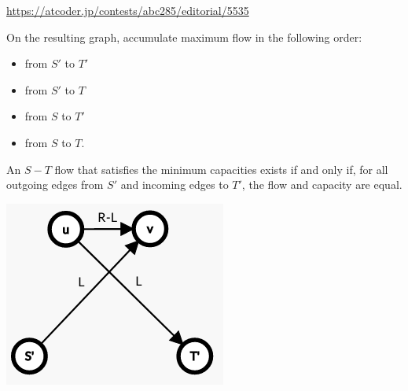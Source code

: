 \url{https://atcoder.jp/contests/abc285/editorial/5535}

On the resulting graph, 
accumulate maximum flow in the following order:
\begin{itemize}
\item from $S'$ to $T'$
\item from $S'$ to $T$
\item from $S$ to $T'$
\item from $S$ to $T$.
\end{itemize}

An $S-T$ flow that satisfies the minimum capacities 
exists if and only if, for all outgoing edges 
from $S'$ and incoming edges to $T'$, 
the flow and capacity are equal.

\begin{center}\begin{minipage}{50mm}
\includegraphics[width=\textwidth]{content/graphs/max-flow-min-capacities.png}
\end{minipage}\end{center}
